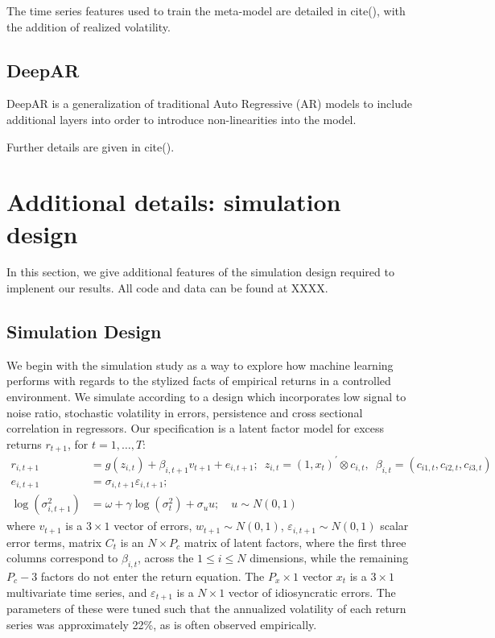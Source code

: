\documentclass{article}
\begin{document}
The time series features used to train the meta-model are detailed in cite(), with the addition of realized volatility.

\subsection{DeepAR}
DeepAR is a generalization of traditional Auto Regressive (AR) models to include additional layers into order to introduce non-linearities into the model.

Further details are given in cite().

\appendix

\newpage

\section{Additional details: simulation design}
In this section, we give additional features of the simulation design required to implenent our results. All code and data can be found at XXXX. 

\subsection{Simulation Design}

We begin with the simulation study as a way to explore how machine learning performs with regards to the stylized facts of empirical returns in a controlled environment. We simulate according to a design which incorporates low signal to noise ratio, stochastic volatility in errors, persistence and cross sectional correlation in regressors. Our specification is a latent factor model for excess returns $r_{t+1}$, for $t=1, \dots, T$:
\begin{align}
r_{i, t+1} &= 
g\left(z_{i, t}\right) + \beta_{i,t+1}v_{t+1} + e_{i, t+1}; 
\enspace z_{i, t} = \left(1, x_{t}\right)^{\prime} \otimes c_{i, t}, 
\enspace \beta_{i, t} = \left(c_{i 1, t}, c_{i 2, t}, c_{i 3, t}\right) \\ 
e_{i, t+1} &= 
\sigma_{i, t+1} \varepsilon_{i, t+1}; \\
\operatorname{log} (\sigma^2_{i,t+1}) &= 
\omega + \gamma \operatorname{log} (\sigma^2_{t}) + \sigma_{u}u;
\quad u \sim N(0, 1)
\end{align}
where $v_{t+1}$ is a $3\times 1$ vector of errors, $w_{t+1} \sim N(0, 1)$,  $\varepsilon_{i,t+1} \sim N(0, 1)$ scalar error terms, matrix $C_t$ is an $N\times P_c$ matrix of latent factors, where the first three columns correspond to $\beta_{i,t}$, across the $1\leq i\leq N$ dimensions, while the remaining $P_c-3$ factors do not enter the return equation. The $P_x\times1$ vector $x_t$ is a $3 \times 1$ multivariate time series, and $\varepsilon_{t+1}$ is a $N\times 1$ vector of idiosyncratic errors. The parameters of these were tuned such that the annualized volatility of each return series was approximately 22\%, as is often observed empirically.
\end{document}
